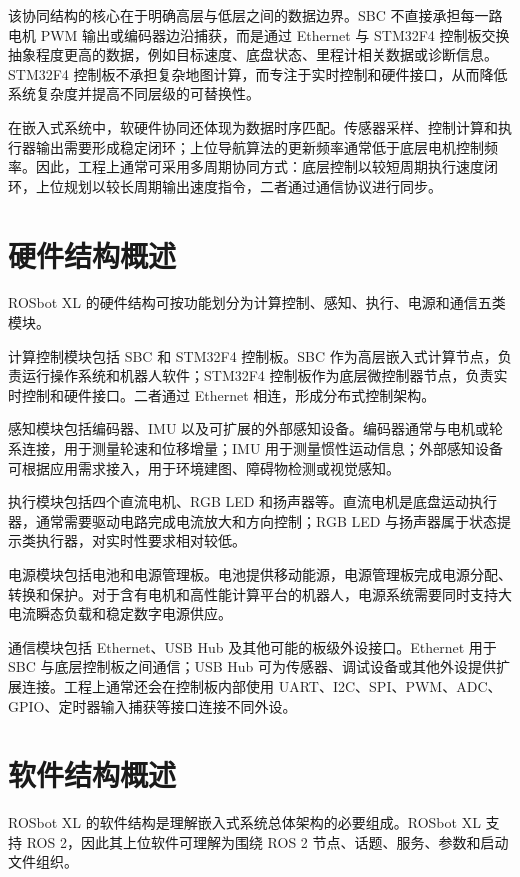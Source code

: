 \documentclass[UTF8,a4paper,12pt]{ctexrep}
\begin{document}
该协同结构的核心在于明确高层与低层之间的数据边界。SBC 不直接承担每一路电机 PWM 输出或编码器边沿捕获，而是通过 Ethernet 与 STM32F4 控制板交换抽象程度更高的数据，例如目标速度、底盘状态、里程计相关数据或诊断信息。STM32F4 控制板不承担复杂地图计算，而专注于实时控制和硬件接口，从而降低系统复杂度并提高不同层级的可替换性。

在嵌入式系统中，软硬件协同还体现为数据时序匹配。传感器采样、控制计算和执行器输出需要形成稳定闭环；上位导航算法的更新频率通常低于底层电机控制频率。因此，工程上通常可采用多周期协同方式：底层控制以较短周期执行速度闭环，上位规划以较长周期输出速度指令，二者通过通信协议进行同步。

\section{硬件结构概述}

ROSbot XL 的硬件结构可按功能划分为计算控制、感知、执行、电源和通信五类模块。

计算控制模块包括 SBC 和 STM32F4 控制板。SBC 作为高层嵌入式计算节点，负责运行操作系统和机器人软件；STM32F4 控制板作为底层微控制器节点，负责实时控制和硬件接口。二者通过 Ethernet 相连，形成分布式控制架构。

感知模块包括编码器、IMU 以及可扩展的外部感知设备。编码器通常与电机或轮系连接，用于测量轮速和位移增量；IMU 用于测量惯性运动信息；外部感知设备可根据应用需求接入，用于环境建图、障碍物检测或视觉感知。

执行模块包括四个直流电机、RGB LED 和扬声器等。直流电机是底盘运动执行器，通常需要驱动电路完成电流放大和方向控制；RGB LED 与扬声器属于状态提示类执行器，对实时性要求相对较低。

电源模块包括电池和电源管理板。电池提供移动能源，电源管理板完成电源分配、转换和保护。对于含有电机和高性能计算平台的机器人，电源系统需要同时支持大电流瞬态负载和稳定数字电源供应。

通信模块包括 Ethernet、USB Hub 及其他可能的板级外设接口。Ethernet 用于 SBC 与底层控制板之间通信；USB Hub 可为传感器、调试设备或其他外设提供扩展连接。工程上通常还会在控制板内部使用 UART、I2C、SPI、PWM、ADC、GPIO、定时器输入捕获等接口连接不同外设。

\section{软件结构概述}

ROSbot XL 的软件结构是理解嵌入式系统总体架构的必要组成。ROSbot XL 支持 ROS 2，因此其上位软件可理解为围绕 ROS 2 节点、话题、服务、参数和启动文件组织。
\end{document}
